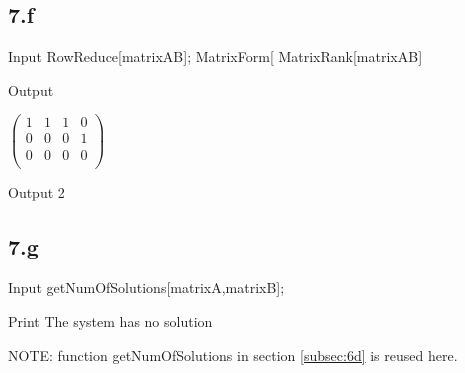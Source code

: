 \documentclass[11pt,a4paper]{article}
\begin{document}
\subsection*{7.f}

\begin{mmaCell}[moredefined={matrixAB}]{Input}
RowReduce[matrixAB];
MatrixForm[%
MatrixRank[matrixAB]
\end{mmaCell}

\begin{mmaCell}[form=MatrixForm]{Output}

\end{mmaCell}
\begin{doublespace}
\noindent\(\left(
\begin{array}{cccc}
 1 & 1 & 1 & 0 \\
 0 & 0 & 0 & 1 \\
 0 & 0 & 0 & 0 \\
\end{array}
\right)\)
\end{doublespace}

\begin{mmaCell}{Output}
2
\end{mmaCell}

\subsection*{7.g}

\begin{mmaCell}[moredefined={getNumOfSolutions, matrixA, matrixB}]{Input}
getNumOfSolutions[matrixA,matrixB];
\end{mmaCell}

\begin{mmaCell}{Print}
The system has no solution
\end{mmaCell}

NOTE: function getNumOfSolutions in section \ref{subsec:6d} is reused here.

\clearpage

\printbibliography

\end{document}
